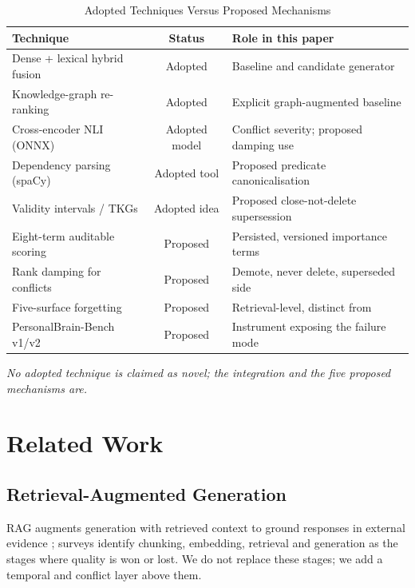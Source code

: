 \documentclass[conference]{IEEEtran}
\begin{document}
\begin{table}[htbp]
\caption{Adopted Techniques Versus Proposed Mechanisms}
\label{tab:adopted}
\centering
\scriptsize
\begin{tabular}{|p{6.4cm}|c|p{6.6cm}|}
\hline
\textbf{Technique} & \textbf{Status} & \textbf{Role in this paper} \\
\hline
Dense + lexical hybrid fusion & Adopted \cite{b3,b4} & Baseline and candidate generator \\
\hline
Knowledge-graph re-ranking & Adopted \cite{b6,b7,b8} & Explicit graph-augmented baseline \\
\hline
Cross-encoder NLI (ONNX) & Adopted model & Conflict severity; proposed damping use \\
\hline
Dependency parsing (spaCy) & Adopted tool & Proposed predicate canonicalisation \\
\hline
Validity intervals / TKGs & Adopted idea \cite{b9} & Proposed close-not-delete supersession \\
\hline
Eight-term auditable scoring & Proposed & Persisted, versioned importance terms \\
\hline
Rank damping for conflicts & Proposed & Demote, never delete, superseded side \\
\hline
Five-surface forgetting & Proposed & Retrieval-level, distinct from \cite{b13} \\
\hline
PersonalBrain-Bench v1/v2 & Proposed & Instrument exposing the failure mode \\
\hline
\end{tabular}
\vspace{0.5mm}

{\scriptsize\itshape No adopted technique is claimed as novel; the integration and the five proposed mechanisms are.}
\end{table}

\section{Related Work}

\subsection{Retrieval-Augmented Generation}
RAG augments generation with retrieved context to ground responses in external evidence \cite{b1,b2}; surveys identify chunking, embedding, retrieval and generation as the stages where quality is won or lost. We do not replace these stages; we add a temporal and conflict layer above them.
\end{document}
